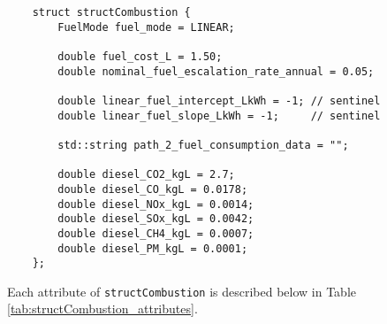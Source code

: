 \documentclass[12pt, letterpaper]{report}
\begin{document}
\begin{verbatim}
    struct structCombustion {
        FuelMode fuel_mode = LINEAR;
        
        double fuel_cost_L = 1.50;
        double nominal_fuel_escalation_rate_annual = 0.05;

        double linear_fuel_intercept_LkWh = -1; // sentinel
        double linear_fuel_slope_LkWh = -1;     // sentinel
        
        std::string path_2_fuel_consumption_data = "";
        
        double diesel_CO2_kgL = 2.7;
        double diesel_CO_kgL = 0.0178;
        double diesel_NOx_kgL = 0.0014;
        double diesel_SOx_kgL = 0.0042;
        double diesel_CH4_kgL = 0.0007;
        double diesel_PM_kgL = 0.0001;
    };
\end{verbatim}

\noindent Each attribute of \texttt{structCombustion} is described below in Table \ref{tab:structCombustion_attributes}.
\end{document}

